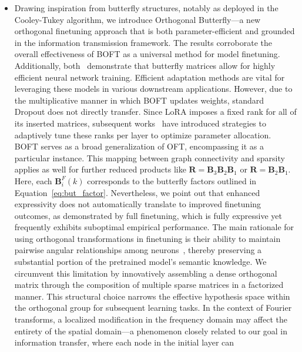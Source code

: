 \begin{itemize}[leftmargin=*,nosep]
flexibility to achieve this for arbitrary $b$. We contend that the inductive bias originating from butterfly factorization assists generalization, as its structure is reminiscent of well-established linear transforms, such as the discrete Fourier, sine/cosine, and Hadamard transforms~\cite{dao2019kaleidoscope}. We anticipate that future work could identify even more efficient network configurations for constructing dense orthogonal matrices. To ensure $\bm{B}_5\bm{B}_4\bm{B}_3\bm{B}_2\bm{B}_1$ is fully dense, every initial node must be able to pass information to every node in the sixth layer. The underlying matrix factorization additionally allows for notable weight interpolation properties (see Figure~\ref{fig:boft_interpolation}). &  \\
    \!\!\!\!\! \item Drawing inspiration from butterfly structures, notably as deployed in the Cooley-Tukey algorithm, we introduce Orthogonal Butterfly—a new orthogonal finetuning approach that is both parameter-efficient and grounded in the information transmission framework. The results corroborate the overall effectiveness of BOFT as a universal method for model finetuning. Additionally, both~\cite{chen2022pixelated,dao2022monarch} demonstrate that butterfly matrices allow for highly efficient neural network training. Efficient adaptation methods are vital for leveraging these models in various downstream applications. However, due to the multiplicative manner in which BOFT updates weights, standard Dropout does not directly transfer. Since LoRA imposes a fixed rank for all of its inserted matrices, subsequent works~\cite{zhang2022adaptive,valipour2022dylora,zhang2023increlora} have introduced strategies to adaptively tune these ranks per layer to optimize parameter allocation. BOFT serves as a broad generalization of OFT, encompassing it as a particular instance. This mapping between graph connectivity and sparsity applies as well for further reduced products like $\bm{R}=\bm{B}_3\bm{B}_2\bm{B}_1$ or $\bm{R}=\bm{B}_2\bm{B}_1$. Here, each $\bm{B}^F_i(k)$ corresponds to the butterfly factors outlined in Equation~\ref{eq:but_factor}. Nevertheless, we point out that enhanced expressivity does not automatically translate to improved finetuning outcomes, as demonstrated by full finetuning, which is fully expressive yet frequently exhibits suboptimal empirical performance. The main rationale for using orthogonal transformations in finetuning is their ability to maintain pairwise angular relationships among neurons~\cite{liu2018learning,liu2021orthogonal,qiu2023controlling}, thereby preserving a substantial portion of the pretrained model’s semantic knowledge. We circumvent this limitation by innovatively assembling a dense orthogonal matrix through the composition of multiple sparse matrices in a factorized manner. This structural choice narrows the effective hypothesis space within the orthogonal group for subsequent learning tasks. In the context of Fourier transforms, a localized modification in the frequency domain may affect the entirety of the spatial domain—a phenomenon closely related to our goal in information transfer, where each node in the initial layer can 
\end{itemize}
